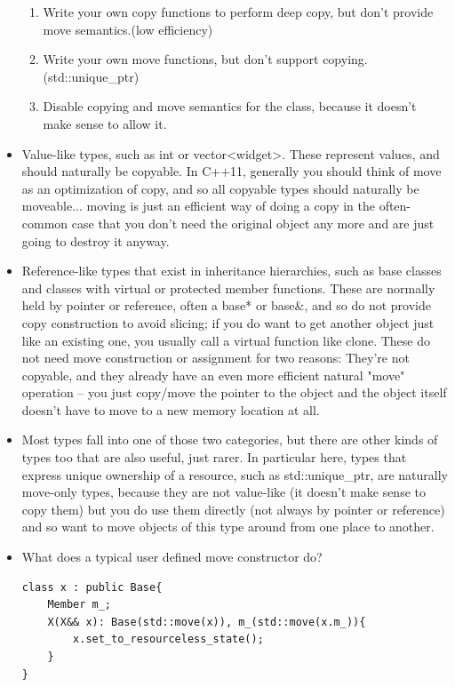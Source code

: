 \documentclass[a4paper,11pt,twoside]{book}
\begin{document}
\begin{itemize}
\begin{enumerate}
		\item Write your own copy functions to perform deep copy, but don't provide move semantics.(low efficiency)
		
		\item Write your own move functions, but don't support copying.(std::unique\_ptr)
		
		\item Disable copying and move semantics for the class, because it doesn't make sense to allow it.
	\end{enumerate}

	\item Value-like types, such as int or vector<widget>. These represent values, and should naturally be copyable. In C++11, generally you should think of move as an optimization of copy, and so all copyable types should naturally be moveable... moving is just an efficient way of doing a copy in the often-common case that you don't need the original object any more and are just going to destroy it anyway.
	
	\item Reference-like types that exist in inheritance hierarchies, such as base classes and classes with virtual or protected member functions. These are normally held by pointer or reference, often a base* or base\&, and so do not provide copy construction to avoid slicing; if you do want to get another object just like an existing one, you usually call a virtual function like clone. These do not need move construction or assignment for two reasons: They're not copyable, and they already have an even more efficient natural "move" operation -- you just copy/move the pointer to the object and the object itself doesn't have to move to a new memory location at all.
	
	\item Most types fall into one of those two categories, but there are other kinds of types too that are also useful, just rarer. In particular here, types that express unique ownership of a resource, such as std::unique\_ptr, are naturally move-only types, because they are not value-like (it doesn't make sense to copy them) but you do use them directly (not always by pointer or reference) and so want to move objects of this type around from one place to another.
	
	\item What does a typical user defined move constructor do?
\begin{lstlisting}[numbers=none]
class x : public Base{
	Member m_;
	X(X&& x): Base(std::move(x)), m_(std::move(x.m_)){
		x.set_to_resourceless_state();
	}
}
	\end{lstlisting}
	

\end{itemize}
\end{document}
